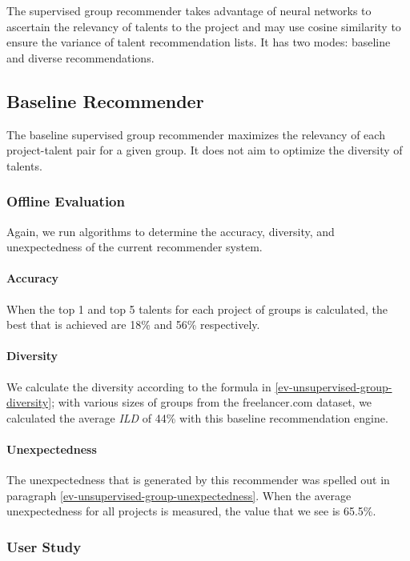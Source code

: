 The supervised group recommender takes advantage of neural networks to ascertain the relevancy of talents to the project and may use cosine similarity to ensure the variance of talent recommendation lists. It has two modes: baseline and diverse recommendations.


\subsection{Baseline Recommender}

The baseline supervised group recommender maximizes the relevancy of each project-talent pair for a given group. It does not aim to optimize the diversity of talents. 

\subsubsection{Offline Evaluation}

Again, we run algorithms to determine the accuracy, diversity, and unexpectedness of the current recommender system.

\paragraph{Accuracy}

When the top 1 and top 5 talents for each project of groups is calculated, the best that is achieved are 18\% and 56\% respectively. 

\paragraph{Diversity}

We calculate the diversity according to the formula in \ref{ev-unsupervised-group-diversity}; with various sizes of groups from the freelancer.com dataset, we calculated the average \textit{ILD} of 44\% with this baseline recommendation engine.

\paragraph{Unexpectedness}

The unexpectedness that is generated by this recommender was spelled out in paragraph \ref{ev-unsupervised-group-unexpectedness}. When the average unexpectedness for all projects is measured, the value that we see is 65.5\%.


\subsubsection{User Study}

